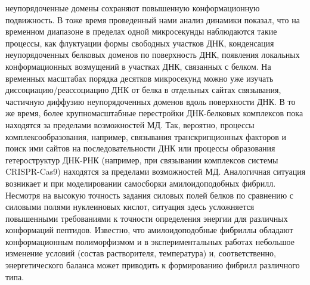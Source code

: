 неупорядоченные домены сохраняют повышенную конформационную подвижность. В тоже время проведенный нами анализ динамики показал, что на временном диапазоне в пределах одной микросекунды наблюдаются такие процессы, как флуктуации формы свободных участков ДНК, конденсация неупорядоченных белковых доменов по поверхность ДНК, появления локальных конформационных возмущений в участках ДНК, связанных с белком. На временных масштабах порядка десятков микросекунд можно уже изучать диссоциацию/реассоциацию ДНК от белка в отдельных сайтах связывания, частичную диффузию неупорядоченных доменов вдоль поверхности ДНК. В то же время, более крупномасштабные перестройки ДНК-белковых комплексов пока находятся за пределами возможностей МД. Так, вероятно, процессы комплексообразования, например, связывания транскрипционных факторов и поиск ими сайтов на последовательности ДНК или процессы образования гетероструктур ДНК-РНК (например, при связывании комплексов системы CRISPR-Cas9) находятся за пределами возможностей МД. Аналогичная ситуация возникает и при моделировании самосборки амилоидоподобных фибрилл. Несмотря на высокую точность задания силовых полей белков по сравнению с силовыми полями нуклеиновых кислот, ситуация здесь усложняется повышенными требованиями к точности определения энергии для различных конформаций пептидов. Известно, что амилоидоподобные фибриллы обладают конформационным полиморфизмом и в экспериментальных работах небольшое изменение условий (состав растворителя, температура) и, соответственно, энергетического баланса может приводить к формированию фибрилл различного типа. 

